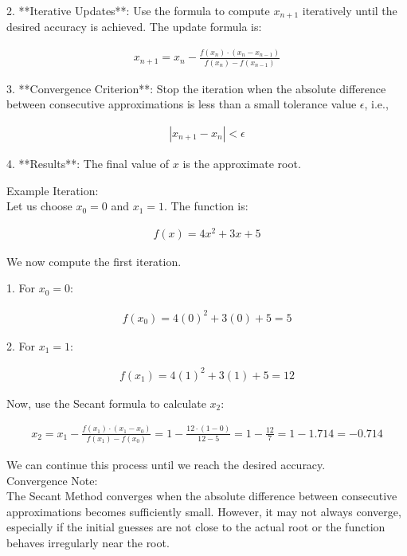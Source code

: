 \documentclass[journal]{IEEEtran}
\begin{document}
2. **Iterative Updates**: Use the formula to compute \( x_{n+1} \) iteratively until the desired accuracy is achieved. The update formula is:

\begin{align}
x_{n+1} = x_n - \frac{f(x_n) \cdot (x_n - x_{n-1})}{f(x_n) - f(x_{n-1})}
\end{align}

3. **Convergence Criterion**: Stop the iteration when the absolute difference between consecutive approximations is less than a small tolerance value \( \epsilon \), i.e.,

\begin{align}
|x_{n+1} - x_n| < \epsilon
\end{align}

4. **Results**: The final value of \( x \) is the approximate root.

 Example Iteration:\\

Let us choose \( x_0 = 0 \) and \( x_1 = 1 \). The function is:

\begin{align}
f(x) = 4x^2 + 3x + 5
\end{align}

We now compute the first iteration.

1. For \( x_0 = 0 \):

\begin{align}
f(x_0) = 4(0)^2 + 3(0) + 5 = 5
\end{align}

2. For \( x_1 = 1 \):

\begin{align}
f(x_1) = 4(1)^2 + 3(1) + 5 = 12
\end{align}

Now, use the Secant formula to calculate \( x_2 \):

\begin{align}
x_2 = x_1 - \frac{f(x_1) \cdot (x_1 - x_0)}{f(x_1) - f(x_0)} = 1 - \frac{12 \cdot (1 - 0)}{12 - 5} = 1 - \frac{12}{7} = 1 - 1.714 = -0.714
\end{align}

We can continue this process until we reach the desired accuracy.\\

 Convergence Note:\\

The Secant Method converges when the absolute difference between consecutive approximations becomes sufficiently small. However, it may not always converge, especially if the initial guesses are not close to the actual root or the function behaves irregularly near the root.\\
\end{document}
